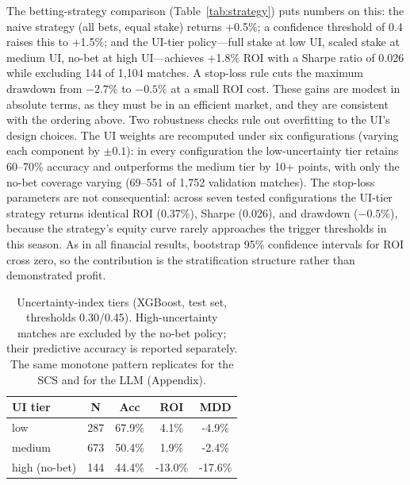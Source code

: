 \documentclass[10pt]{article}
\begin{document}
The betting-strategy comparison
(Table~\ref{tab:strategy}) puts numbers on this: the naive
strategy (all bets, equal stake) returns +0.5\%; a confidence threshold of 0.4
raises this to +1.5\%; and the UI-tier policy---full stake at low UI, scaled
stake at medium UI, no-bet at high UI---achieves +1.8\% ROI with a Sharpe ratio
of 0.026 while excluding 144 of 1{,}104 matches. A stop-loss rule cuts the maximum
drawdown from $-2.7\%$ to $-0.5\%$ at a small ROI cost. These gains
are modest in absolute terms, as they must be in an efficient market, and they
are consistent with the ordering above. Two robustness checks
rule out overfitting to the UI's design choices. The UI weights are
recomputed under six configurations (varying each component by $\pm 0.1$): in
every configuration the low-uncertainty tier retains 60--70\% accuracy and
outperforms the medium tier by 10+ points, with only the no-bet coverage
varying (69--551 of 1{,}752 validation matches). The stop-loss
parameters are not consequential: across seven tested configurations the
UI-tier strategy returns identical ROI (0.37\%), Sharpe (0.026), and drawdown
($-0.5\%$), because the strategy's equity curve rarely approaches the trigger
thresholds in this season. As in all financial results, bootstrap 95\%
confidence intervals for ROI cross zero, so the contribution is the
stratification structure rather than demonstrated profit.

\begin{table}[htbp]
\centering
\caption{Uncertainty-index tiers (XGBoost, test set, thresholds 0.30/0.45).
High-uncertainty matches are excluded by the no-bet policy; their predictive
accuracy is reported separately. The same monotone pattern replicates for the
SCS and for the LLM (Appendix).}
\label{tab:uitiers}
\small
\begin{tabular}{lcccc}
\toprule
UI tier & N & Acc & ROI & MDD \\
\midrule
low & 287 & 67.9\% & 4.1\% & -4.9\% \\
medium & 673 & 50.4\% & 1.9\% & -2.4\% \\
high (no-bet) & 144 & 44.4\% & -13.0\% & -17.6\% \\
\bottomrule
\end{tabular}
\end{table}
\end{document}
